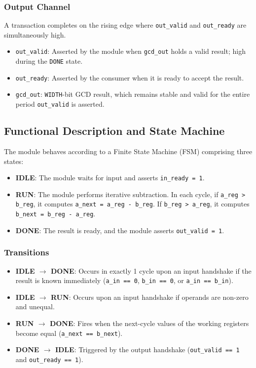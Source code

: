 \subsubsection{Output Channel}
A transaction completes on the rising edge where \texttt{out\_valid} and \texttt{out\_ready} are simultaneously high.
\begin{itemize}
    \item \texttt{out\_valid}: Asserted by the module when \texttt{gcd\_out} holds a valid result; high during the \texttt{DONE} state.
    \item \texttt{out\_ready}: Asserted by the consumer when it is ready to accept the result.
    \item \texttt{gcd\_out}: \texttt{WIDTH}-bit GCD result, which remains stable and valid for the entire period \texttt{out\_valid} is asserted.
\end{itemize}

\subsection{Functional Description and State Machine}
The module behaves according to a Finite State Machine (FSM) comprising three states:
\begin{itemize}
    \item \textbf{IDLE}: The module waits for input and asserts \texttt{in\_ready = 1}.
    \item \textbf{RUN}: The module performs iterative subtraction. In each cycle, if \texttt{a\_reg > b\_reg}, it computes \texttt{a\_next = a\_reg - b\_reg}. If \texttt{b\_reg > a\_reg}, it computes \texttt{b\_next = b\_reg - a\_reg}.
    \item \textbf{DONE}: The result is ready, and the module asserts \texttt{out\_valid = 1}.
\end{itemize}

\subsubsection{Transitions}
\begin{itemize}
    \item \textbf{IDLE $\rightarrow$ DONE}: Occurs in exactly 1 cycle upon an input handshake if the result is known immediately (\texttt{a\_in == 0}, \texttt{b\_in == 0}, or \texttt{a\_in == b\_in}).
    \item \textbf{IDLE $\rightarrow$ RUN}: Occurs upon an input handshake if operands are non-zero and unequal.
    \item \textbf{RUN $\rightarrow$ DONE}: Fires when the next-cycle values of the working registers become equal (\texttt{a\_next == b\_next}).
    \item \textbf{DONE $\rightarrow$ IDLE}: Triggered by the output handshake (\texttt{out\_valid == 1} and \texttt{out\_ready == 1}).
\end{itemize}

